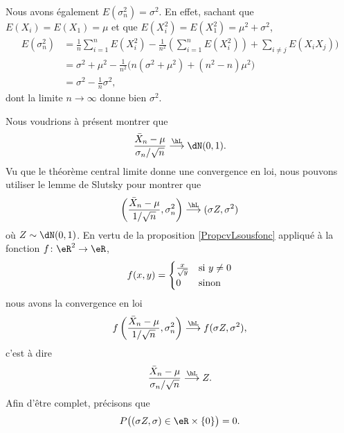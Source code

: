 \begin{example}
    Nous avons également \( E(\sigma_n^2)=\sigma^2\). En effet, sachant que \( E(X_i)=E(X_1)=\mu\) et que \( E(X_i^2)=E(X_1^2)=\mu^2+\sigma^2\),
    \begin{subequations}
        \begin{align}
            E(\sigma_n^2)&=\frac{1}{ n }\sum_{i=1}^nE(X_i^2)-\frac{1}{ n^2 }\left( \sum_{i=1}^nE(X_i^2) \right)+\sum_{i\neq j}E(X_iX_j))\\
            &=\sigma^2+\mu^2-\frac{1}{ n^2 }\big( n(\sigma^2+\mu^2)+(n^2-n)\mu^2 \big)\\
            &=\sigma^2-\frac{1}{ n }\sigma^2,
        \end{align}
    \end{subequations}
    dont la limite \( n\to\infty\) donne bien \( \sigma^2\).

    Nous voudrions à présent montrer que 
    \begin{equation}
        \frac{ \bar X_n-\mu }{ \sigma_n/\sqrt{n} }\stackrel{\hL}{\longrightarrow}\dN(0,1).
    \end{equation}
    Vu que le théorème central limite donne une convergence en loi, nous pouvons utiliser le lemme de Slutsky pour montrer que
    \begin{equation}
        \left( \frac{ \bar X_n-\mu }{ 1/\sqrt{n} },\sigma_n^2 \right)\stackrel{\hL}{\longrightarrow}(\sigma Z,\sigma^2)
    \end{equation}
    où \( Z\sim\dN(0,1)\). En vertu de la proposition \ref{PropcvLsousfonc} appliqué à la fonction \( f\colon \eR^2\to \eR\),
    \begin{equation}
        f(x,y)=\begin{cases}
            \frac{ x }{ \sqrt{y} }    &   \text{si \( y\neq 0\)}\\
            0    &    \text{sinon}
        \end{cases}
    \end{equation}
    nous avons la convergence en loi
    \begin{equation}
        f\left( \frac{ \bar X_n-\mu }{ 1/\sqrt{n} },\sigma_n^2 \right)\stackrel{\hL}{\longrightarrow}f(\sigma Z,\sigma^2),
    \end{equation}
    c'est à dire 
    \begin{equation}
        \frac{ \bar X_n-\mu }{ \sigma_n/\sqrt{n} }\stackrel{\hL}{\longrightarrow}Z.
    \end{equation}
    Afin d'être complet, précisons que 
    \begin{equation}
        P\big( (\sigma Z,\sigma)\in\eR\times \{ 0 \} \big)=0.
    \end{equation}
\end{example}

